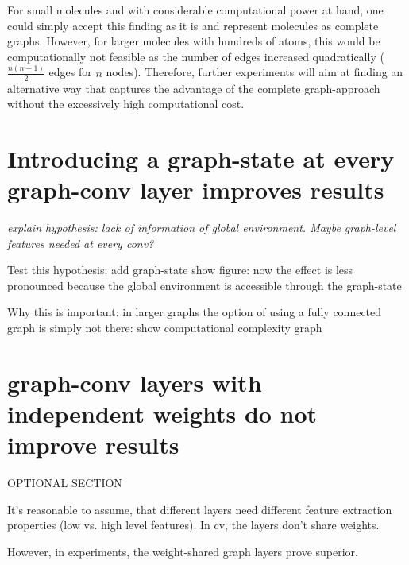 For small molecules and with considerable computational power at hand, one could simply accept this finding as it is and represent molecules as complete graphs. However, for larger molecules with hundreds of atoms, this would be computationally not feasible as the number of edges increased quadratically ($\frac{n(n - 1)}{2}$ edges for $n$ nodes). Therefore, further experiments will aim at finding an alternative way that captures the advantage of the complete graph-approach without the excessively high computational cost.


%
%


\section{Introducing a graph-state at every graph-conv layer improves results}



{\itshape
explain hypothesis:
lack of information of global environment. Maybe graph-level features needed at every conv?

Test this hypothesis:
add graph-state
show figure: now the effect is less pronounced because the global environment is accessible through the graph-state

Why this is important:
in larger graphs the option of using a fully connected graph is simply not there:
show computational complexity graph
}


\section{graph-conv layers with independent weights do not improve results}

{\itshape
	
OPTIONAL SECTION

It's reasonable to assume, that different layers need different feature extraction properties (low vs. high level features). In cv, the layers don't share weights.

However, in experiments, the weight-shared graph layers prove superior.
}

